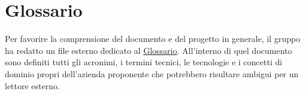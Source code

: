 \appendix
 
\section{Glossario}
 
Per favorire la comprensione del documento e del progetto in generale, il gruppo ha
redatto un file esterno dedicato al
\href{https://synergo-unit-unipd.github.io/Documentary-Repo/docs/CC/doc_gestionali/doc_interni/glossario/glossario.pdf}
     {\underline{Glossario}}. All'interno di quel documento sono definiti tutti gli
acronimi, i termini tecnici, le tecnologie e i concetti di dominio propri
dell'azienda proponente che potrebbero risultare ambigui per un lettore esterno.
 